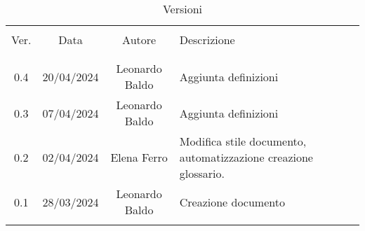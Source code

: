 \documentclass[italian,12pt]{article}
\begin{document}


\newpage



\begin{table}[!h]
	\caption{Versioni}
	\begin{center}
		\begin{tabular}{ c c c p{9cm} }
			\hline                                                                                               \\[-2ex]
			Ver. & Data       & Autore         & Descrizione \\
			\\[-2ex] \hline \\[-1.5ex]
            0.4  & 20/04/2024 & Leonardo Baldo & Aggiunta definizioni \\
            0.3  & 07/04/2024 & Leonardo Baldo & Aggiunta definizioni \\
			0.2  & 02/04/2024 & Elena Ferro    & Modifica stile documento, automatizzazione creazione glossario. \\
			0.1  & 28/03/2024 & Leonardo Baldo & Creazione documento \\
			\\[-1.5ex] \hline
		\end{tabular}
	\end{center}
\end{table}

\newpage

\tableofcontents

\printglossary[style=myaltlistgroup,title=]
\end{document}
